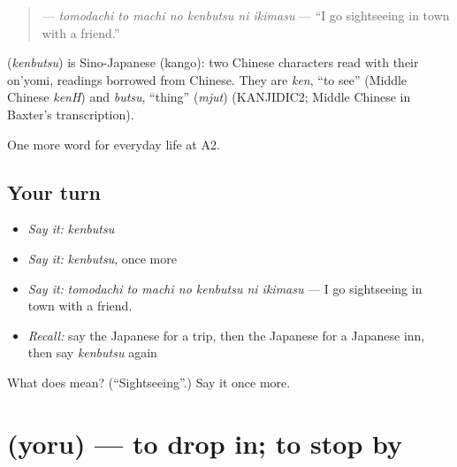 \begin{quote}
\textbf{   } — \emph{tomodachi to machi no kenbutsu ni ikimasu} — \textquotedblleft{}I go sightseeing in town with a friend.\textquotedblright{}
\end{quote}

\begin{cousinweb}
\textbf{} (\emph{kenbutsu}) is Sino-Japanese (kango): two Chinese characters read with their on'yomi, readings borrowed from Chinese. They are \emph{ken}, \textquotedblleft{}to see\textquotedblright{} (Middle Chinese \emph{kenH}) and \emph{butsu}, \textquotedblleft{}thing\textquotedblright{} (\emph{mjut}) (KANJIDIC2; Middle Chinese in Baxter's transcription).
\end{cousinweb}

\begin{grammarlens}[title={What you've built}]
One more word for everyday life at A2.
\end{grammarlens}

\subsection*{Your turn}
\begin{itemize}
\raggedright
  \item \emph{Say it:} \emph{kenbutsu}
  \item \emph{Say it:} \emph{kenbutsu}, once more
  \item \emph{Say it:} \emph{tomodachi to machi no kenbutsu ni ikimasu} — I go sightseeing in town with a friend.
  \item \emph{Recall:} say the Japanese for a trip, then the Japanese for a Japanese inn, then say \emph{kenbutsu} again
\end{itemize}

\begin{tcolorbox}[breakable,colback=teal!4,colframe=teal!35!black,title={Before you move on}]
What does  mean? (\textquotedblleft{}Sightseeing\textquotedblright{}.) Say it once more.
\end{tcolorbox}
\section[\texorpdfstring{\ja{よる} (yoru)}{よる (yoru)}]{ (yoru) — to drop in; to stop by}

\label{lesson:JA-C204-yoru}



